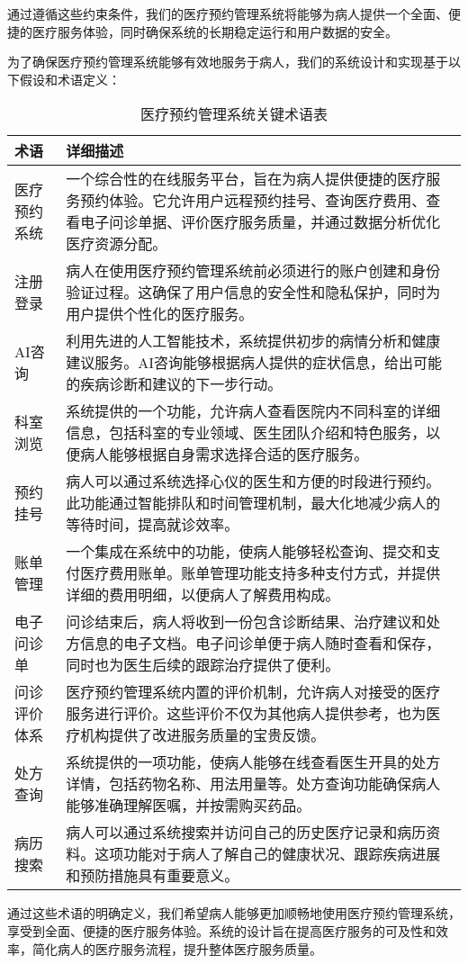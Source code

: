 通过遵循这些约束条件，我们的医疗预约管理系统将能够为病人提供一个全面、便捷的医疗服务体验，同时确保系统的长期稳定运行和用户数据的安全。

为了确保医疗预约管理系统能够有效地服务于病人，我们的系统设计和实现基于以下假设和术语定义：

\begin{table}[htbp]
	\centering
	\begin{tabular}{|l|p{10cm}|}
		\hline
		\textbf{术语} & \textbf{详细描述} \\ \hline
		医疗预约系统 & 一个综合性的在线服务平台，旨在为病人提供便捷的医疗服务预约体验。它允许用户远程预约挂号、查询医疗费用、查看电子问诊单据、评价医疗服务质量，并通过数据分析优化医疗资源分配。 \\ \hline
		注册登录 & 病人在使用医疗预约管理系统前必须进行的账户创建和身份验证过程。这确保了用户信息的安全性和隐私保护，同时为用户提供个性化的医疗服务。 \\ \hline
		AI咨询 & 利用先进的人工智能技术，系统提供初步的病情分析和健康建议服务。AI咨询能够根据病人提供的症状信息，给出可能的疾病诊断和建议的下一步行动。 \\ \hline
		科室浏览 & 系统提供的一个功能，允许病人查看医院内不同科室的详细信息，包括科室的专业领域、医生团队介绍和特色服务，以便病人能够根据自身需求选择合适的医疗服务。 \\ \hline
		预约挂号 & 病人可以通过系统选择心仪的医生和方便的时段进行预约。此功能通过智能排队和时间管理机制，最大化地减少病人的等待时间，提高就诊效率。 \\ \hline
		账单管理 & 一个集成在系统中的功能，使病人能够轻松查询、提交和支付医疗费用账单。账单管理功能支持多种支付方式，并提供详细的费用明细，以便病人了解费用构成。 \\ \hline
		电子问诊单 & 问诊结束后，病人将收到一份包含诊断结果、治疗建议和处方信息的电子文档。电子问诊单便于病人随时查看和保存，同时也为医生后续的跟踪治疗提供了便利。 \\ \hline
		问诊评价体系 & 医疗预约管理系统内置的评价机制，允许病人对接受的医疗服务进行评价。这些评价不仅为其他病人提供参考，也为医疗机构提供了改进服务质量的宝贵反馈。 \\ \hline
		处方查询 & 系统提供的一项功能，使病人能够在线查看医生开具的处方详情，包括药物名称、用法用量等。处方查询功能确保病人能够准确理解医嘱，并按需购买药品。 \\ \hline
		病历搜索 & 病人可以通过系统搜索并访问自己的历史医疗记录和病历资料。这项功能对于病人了解自己的健康状况、跟踪疾病进展和预防措施具有重要意义。 \\ \hline
	\end{tabular}
	\caption{医疗预约管理系统关键术语表}
\end{table}

通过这些术语的明确定义，我们希望病人能够更加顺畅地使用医疗预约管理系统，享受到全面、便捷的医疗服务体验。系统的设计旨在提高医疗服务的可及性和效率，简化病人的医疗服务流程，提升整体医疗服务质量。
